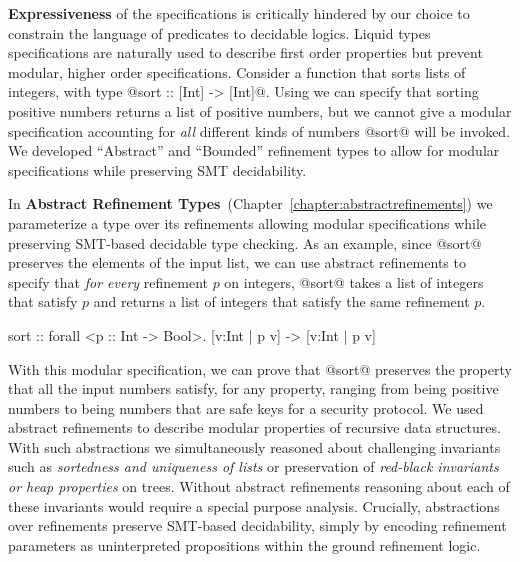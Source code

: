 \textbf{Expressiveness} of the specifications is critically hindered 
by our choice to constrain the language of predicates to decidable logics.
%
Liquid types specifications are naturally used to describe first order properties
but prevent modular, higher order specifications. 
%
Consider a function that sorts lists of integers, with type 
@sort :: [Int] -> [Int]@.
%
Using \toolname we can specify that 
sorting positive numbers returns a list of positive numbers,
but we cannot give a modular specification 
accounting for \textit{all} different kinds of numbers
@sort@ will be invoked. 
%
We developed ``Abstract'' and ``Bounded'' refinement types to allow for 
modular specifications while preserving SMT decidability. 

In \textbf{Abstract Refinement Types}~(Chapter~\ref{chapter:abstractrefinements})
we parameterize a type over its refinements
allowing modular specifications while preserving SMT-based decidable type checking. 
%
As an example, 
since @sort@ preserves the elements of the input list,
we can use abstract refinements to specify
that \textit{for every} refinement $p$ on integers, 
@sort@ takes a list of integers that satisfy $p$ and returns a list of integers that satisfy
the same refinement $p$.
\begin{code}
  sort :: forall <p :: Int -> Bool>. [{v:Int | p v}] -> [{v:Int | p v}]
\end{code}
%
With this modular specification, 
we can prove that @sort@ preserves the property that all the input numbers satisfy, 
for any property, ranging from being positive numbers to 
being numbers that are safe keys for a security protocol.
%
We used abstract refinements to describe modular properties of recursive data structures. 
With such abstractions we simultaneously 
reasoned about challenging invariants such as 
\textit{sortedness and uniqueness of lists} or 
preservation of \textit{red-black invariants or heap properties} on trees. 
%
Without abstract refinements reasoning about each of these invariants would 
require a special purpose analysis. 
%
Crucially, abstractions over refinements 
preserve SMT-based decidability, simply by encoding 
refinement parameters as uninterpreted propositions within the ground
refinement logic.

